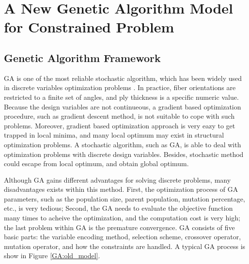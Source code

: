 
\chapter{A New Genetic Algorithm Model for Constrained Problem} %

\label{Chapter3} %


\section{Genetic Algorithm Framework}
GA is one of the most reliable stochastic algorithm, which has been widely used
in discrete variables optimization problems  \cite { schmit1973optimum,
	schmit1977optimum, fukunaga1991strength, soares1995discrete, le1995improved,
	jayatheertha1996application, wang1996optimum, adali1997minimum,
	correia1997higher, scares1997optimization, abu1998optimum, lombardi1998anti,
le1998design, sivakumar1998optimum, barakat1999use, richard2000reliability,
moita2000sensitivity, soremekun2001composite, walker2003technique,
di2003multiconstrained, kere2003using}. In practice, fiber orientations are
restricted to a finite set of angles, and ply thickness is a specific numeric
value. Because the design variables are not continueous, a gradient based
optimization procedure, such as gradient descent method, is not suitable to cope
with such problems. Moreover, gradient based optimization approach is very eazy
to get trapped in local minima, and many local optimum may exist in structural
optimization problems. A stochastic algorithm, such as GA, is able to deal with
optimization problems with discrete design variables. Besides, stochastic method
could escape from local optimum, and obtain global optimum. 

Although GA gains different advantages for solving discrete problems, many
disadvantages exists within this method. First, the optimization process of GA
parameters, such as the population size, parent population, mutation percentage,
etc., is very tedious; Second, the GA needs to evaluate the objective function
many times to acheive the optimization, and the computation cost is very high;
the last problem within GA is the premature convergence. GA consists of five
basic parts: the variable encoding method, selection scheme, crossover operator,
mutation operator, and how the constraints are handled. A typical GA process is
show in Figure \ref{GA:old_model}.

